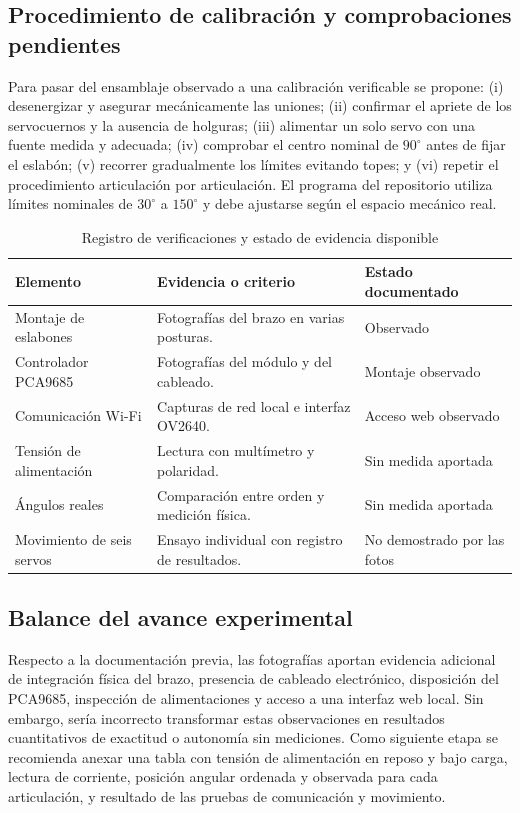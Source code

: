 \subsection{Procedimiento de calibración y comprobaciones pendientes}
Para pasar del ensamblaje observado a una calibración verificable se propone: (i) desenergizar y asegurar mecánicamente las uniones; (ii) confirmar el apriete de los servocuernos y la ausencia de holguras; (iii) alimentar un solo servo con una fuente medida y adecuada; (iv) comprobar el centro nominal de $90^\circ$ antes de fijar el eslabón; (v) recorrer gradualmente los límites evitando topes; y (vi) repetir el procedimiento articulación por articulación. El programa del repositorio utiliza límites nominales de $30^\circ$ a $150^\circ$ y debe ajustarse según el espacio mecánico real.

\begin{table}[H]
\centering\small
\caption{Registro de verificaciones y estado de evidencia disponible}
\label{tab:actualizacion_verificaciones}
\begin{tabularx}{\textwidth}{p{4.0cm} X p{3.2cm}}
\toprule
\textbf{Elemento} & \textbf{Evidencia o criterio} & \textbf{Estado documentado}\\
\midrule
Montaje de eslabones & Fotografías del brazo en varias posturas. & Observado\\
Controlador PCA9685 & Fotografías del módulo y del cableado. & Montaje observado\\
Comunicación Wi-Fi & Capturas de red local e interfaz OV2640. & Acceso web observado\\
Tensión de alimentación & Lectura con multímetro y polaridad. & Sin medida aportada\\
Ángulos reales & Comparación entre orden y medición física. & Sin medida aportada\\
Movimiento de seis servos & Ensayo individual con registro de resultados. & No demostrado por las fotos\\
\bottomrule
\end{tabularx}
\end{table}

\subsection{Balance del avance experimental}
Respecto a la documentación previa, las fotografías aportan evidencia adicional de integración física del brazo, presencia de cableado electrónico, disposición del PCA9685, inspección de alimentaciones y acceso a una interfaz web local. Sin embargo, sería incorrecto transformar estas observaciones en resultados cuantitativos de exactitud o autonomía sin mediciones. Como siguiente etapa se recomienda anexar una tabla con tensión de alimentación en reposo y bajo carga, lectura de corriente, posición angular ordenada y observada para cada articulación, y resultado de las pruebas de comunicación y movimiento.
